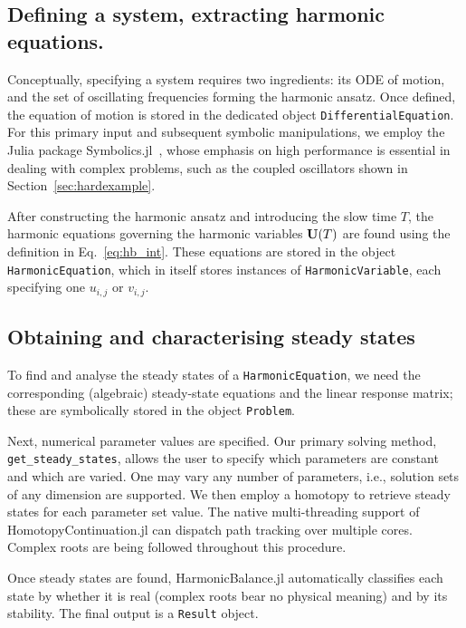 \subsection{Defining a system, extracting harmonic equations.}

Conceptually, specifying a system requires two ingredients: its ODE of motion, and the set of oscillating frequencies forming the harmonic ansatz. Once defined, the equation of motion is stored in the dedicated object \texttt{DifferentialEquation}. For this primary input and subsequent symbolic manipulations, we employ the Julia package Symbolics.jl~\cite{10.1145/3511528.3511535}, whose emphasis on high performance is essential in dealing with complex problems, such as the coupled oscillators shown in Section~\ref{sec:hardexample}. 

After constructing the harmonic ansatz and introducing the slow time $T$, the harmonic equations governing the harmonic variables $\vb{U}(T)$ are found using the definition in Eq.~\eqref{eq:hb_int}. These equations are stored in the object \texttt{HarmonicEquation}, which in itself stores instances of \texttt{HarmonicVariable}, each specifying one $u_{i,j}$ or $v_{i,j}$.


\subsection{Obtaining and characterising steady states}

To find and analyse the steady states of a \texttt{HarmonicEquation}, we need the corresponding (algebraic) steady-state equations and the linear response matrix; these are symbolically stored in the object \texttt{Problem}.

Next, numerical parameter values are specified. Our primary solving method, \texttt{get\_steady\_states}, allows the user to specify which parameters are constant and which are varied. One may vary any number of parameters, i.e., solution sets of any dimension are supported. We then employ a homotopy to retrieve steady states for each parameter set value. The native multi-threading support of HomotopyContinuation.jl can dispatch path tracking over multiple cores. Complex roots are being followed throughout this procedure.

Once steady states are found, HarmonicBalance.jl automatically classifies each state by whether it is real (complex roots bear no physical meaning) and by its stability. The final output is a \texttt{Result} object.


